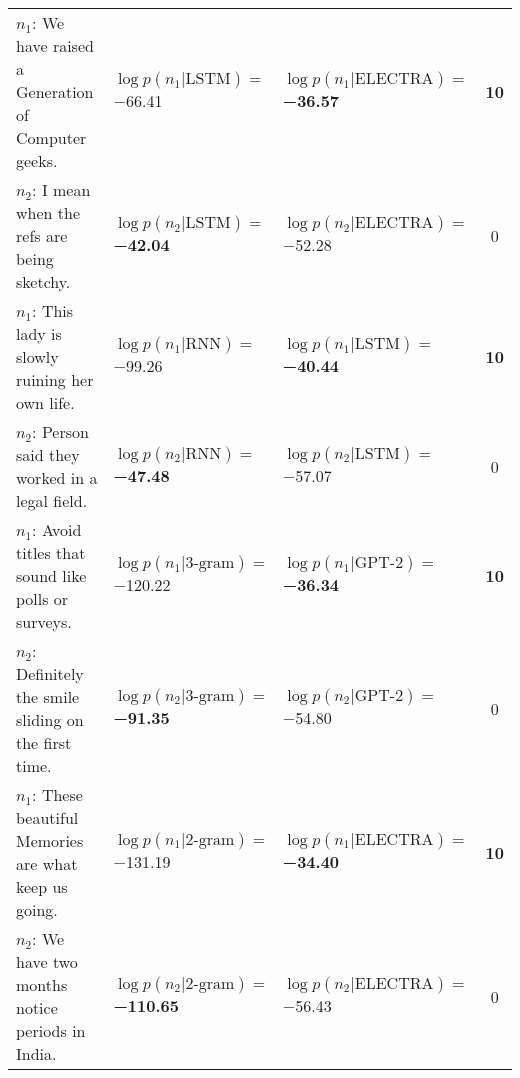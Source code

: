 \begin{tabularx}{\textwidth}{lllc}
          $n_1$: We have raised a Generation of Computer geeks. &              $\log p(n_1 | \textrm{LSTM})=$\num{-66.41} &  $\log p(n_1 | \textrm{ELECTRA})=$\textbf{\num{-36.57}} &  \textbf{\num{10}} \\
                 $n_2$: I mean when the refs are being sketchy. &     $\log p(n_2 | \textrm{LSTM})=$\textbf{\num{-42.04}} &           $\log p(n_2 | \textrm{ELECTRA})=$\num{-52.28} &            \num{0} \\\midrule
               $n_1$: This lady is slowly ruining her own life. &               $\log p(n_1 | \textrm{RNN})=$\num{-99.26} &     $\log p(n_1 | \textrm{LSTM})=$\textbf{\num{-40.44}} &  \textbf{\num{10}} \\
               $n_2$: Person said they worked in a legal field. &      $\log p(n_2 | \textrm{RNN})=$\textbf{\num{-47.48}} &              $\log p(n_2 | \textrm{LSTM})=$\num{-57.07} &            \num{0} \\\midrule
          $n_1$: Avoid titles that sound like polls or surveys. &           $\log p(n_1 | \textrm{3-gram})=$\num{-120.22} &    $\log p(n_1 | \textrm{GPT-2})=$\textbf{\num{-36.34}} &  \textbf{\num{10}} \\
         $n_2$: Definitely the smile sliding on the first time. &   $\log p(n_2 | \textrm{3-gram})=$\textbf{\num{-91.35}} &             $\log p(n_2 | \textrm{GPT-2})=$\num{-54.80} &            \num{0} \\\midrule
        $n_1$: These beautiful Memories are what keep us going. &           $\log p(n_1 | \textrm{2-gram})=$\num{-131.19} &  $\log p(n_1 | \textrm{ELECTRA})=$\textbf{\num{-34.40}} &  \textbf{\num{10}} \\
             $n_2$: We have two months notice periods in India. &  $\log p(n_2 | \textrm{2-gram})=$\textbf{\num{-110.65}} &           $\log p(n_2 | \textrm{ELECTRA})=$\num{-56.43} &            \num{0} \\
\bottomrule
\end{tabularx}
